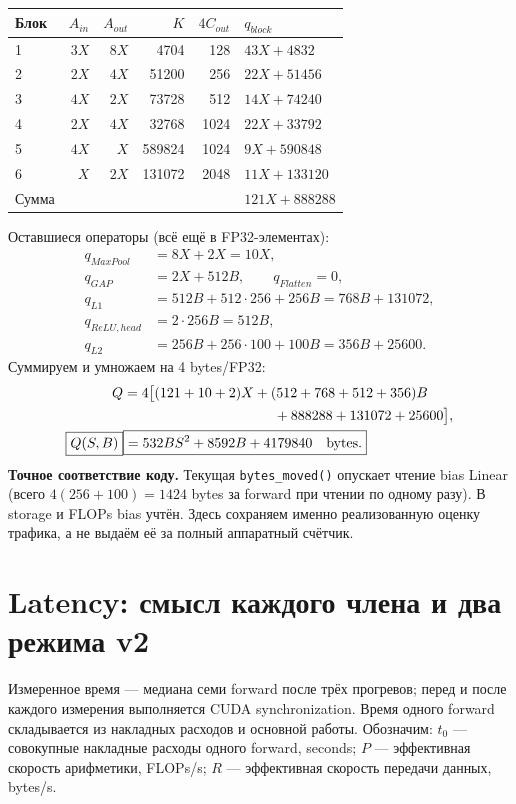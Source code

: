 \documentclass[11pt,a4paper]{article}
\newcommand{\page}[1]{\clearpage\section{#1}}
\begin{document}
\begin{center}\small
\begin{tabular}{lrrrrl}
\toprule
Блок & $A_{in}$ & $A_{out}$ & $K$ & $4C_{out}$ & $q_{block}$ \\
\midrule
1 & $3X$ & $8X$ & 4704 & 128 & $43X+4832$ \\
2 & $2X$ & $4X$ & 51200 & 256 & $22X+51456$ \\
3 & $4X$ & $2X$ & 73728 & 512 & $14X+74240$ \\
4 & $2X$ & $4X$ & 32768 & 1024 & $22X+33792$ \\
5 & $4X$ & $X$ & 589824 & 1024 & $9X+590848$ \\
6 & $X$ & $2X$ & 131072 & 2048 & $11X+133120$ \\
\midrule
Сумма & & & & & $121X+888288$ \\
\bottomrule
\end{tabular}\end{center}

Оставшиеся операторы (всё ещё в FP32-элементах):
\begin{align*}
 q_{MaxPool}&=8X+2X=10X,\\
 q_{GAP}&=2X+512B,\qquad q_{Flatten}=0,\\
 q_{L1}&=512B+512\cdot256+256B=768B+131072,\\
 q_{ReLU,head}&=2\cdot256B=512B,\\
 q_{L2}&=256B+256\cdot100+100B=356B+25600.
\end{align*}
Суммируем и умножаем на 4 bytes/FP32:
\begin{align*}
 Q&=4\bigl[(121+10+2)X+(512+768+512+356)B\\
 &\hspace{38mm}+888288+131072+25600\bigr],\\
 \boxed{Q(S,B)}&\boxed{=532BS^2+8592B+4179840\quad\text{bytes}.}
\end{align*}
\textbf{Точное соответствие коду.} Текущая \texttt{bytes\_moved()} опускает
чтение bias Linear (всего $4(256+100)=1424$ bytes за forward при чтении
по одному разу). В storage и FLOPs bias учтён. Здесь сохраняем именно
реализованную оценку трафика, а не выдаём её за полный аппаратный счётчик.

\page{Latency: смысл каждого члена и два режима v2}
Измеренное время --- медиана семи forward после трёх прогревов; перед
и после каждого измерения выполняется CUDA synchronization.
Время одного forward складывается из накладных расходов и основной работы.
Обозначим: $t_0$ --- совокупные накладные расходы одного forward, seconds;
$P$ --- эффективная скорость арифметики, FLOPs/s;
$R$ --- эффективная скорость передачи данных, bytes/s.
\end{document}
